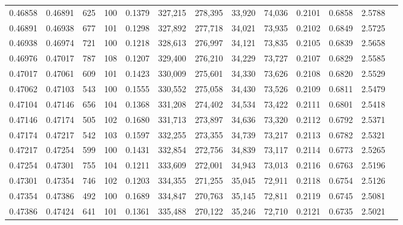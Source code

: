 \begin{tabular}{rrrrrrrrrrrrr}
0.46858 & 0.46891 &   625 & 100 &                                     0.1379 & 327,215 & 278,395 &  33,920 &  74,036 & 0.2101 & 0.6858 & 2.5788 \\
0.46891 & 0.46938 &   677 & 101 &                                     0.1298 & 327,892 & 277,718 &  34,021 &  73,935 & 0.2102 & 0.6849 & 2.5725 \\
0.46938 & 0.46974 &   721 & 100 &                                     0.1218 & 328,613 & 276,997 &  34,121 &  73,835 & 0.2105 & 0.6839 & 2.5658 \\
0.46976 & 0.47017 &   787 & 108 &                                     0.1207 & 329,400 & 276,210 &  34,229 &  73,727 & 0.2107 & 0.6829 & 2.5585 \\
0.47017 & 0.47061 &   609 & 101 &                                     0.1423 & 330,009 & 275,601 &  34,330 &  73,626 & 0.2108 & 0.6820 & 2.5529 \\
0.47062 & 0.47103 &   543 & 100 &                                     0.1555 & 330,552 & 275,058 &  34,430 &  73,526 & 0.2109 & 0.6811 & 2.5479 \\
0.47104 & 0.47146 &   656 & 104 &                                     0.1368 & 331,208 & 274,402 &  34,534 &  73,422 & 0.2111 & 0.6801 & 2.5418 \\
0.47146 & 0.47174 &   505 & 102 &                                     0.1680 & 331,713 & 273,897 &  34,636 &  73,320 & 0.2112 & 0.6792 & 2.5371 \\
0.47174 & 0.47217 &   542 & 103 &                                     0.1597 & 332,255 & 273,355 &  34,739 &  73,217 & 0.2113 & 0.6782 & 2.5321 \\
0.47217 & 0.47254 &   599 & 100 &                                     0.1431 & 332,854 & 272,756 &  34,839 &  73,117 & 0.2114 & 0.6773 & 2.5265 \\
0.47254 & 0.47301 &   755 & 104 &                                     0.1211 & 333,609 & 272,001 &  34,943 &  73,013 & 0.2116 & 0.6763 & 2.5196 \\
0.47301 & 0.47354 &   746 & 102 &                                     0.1203 & 334,355 & 271,255 &  35,045 &  72,911 & 0.2118 & 0.6754 & 2.5126 \\
0.47354 & 0.47386 &   492 & 100 &                                     0.1689 & 334,847 & 270,763 &  35,145 &  72,811 & 0.2119 & 0.6745 & 2.5081 \\
0.47386 & 0.47424 &   641 & 101 &                                     0.1361 & 335,488 & 270,122 &  35,246 &  72,710 & 0.2121 & 0.6735 & 2.5021 \\

\end{tabular}
